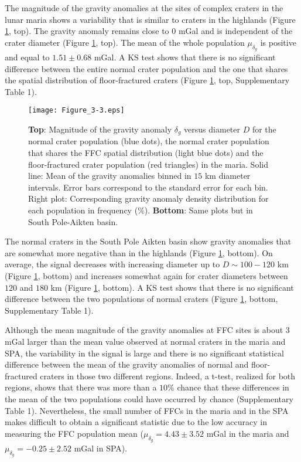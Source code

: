 The magnitude of the gravity anomalies at the sites of complex craters
in the lunar  maria shows a variability that is  similar to craters in
the  highlands (Figure  \ref{Figure3-3},  top).   The gravity  anomaly
remains close  to $0$ mGal and  is independent of the  crater diameter
(Figure  \ref{Figure3-3},  top).  The  mean  of  the whole  population
$\mu_{\delta_g}$ is positive and equal to  $1.51 \pm 0.68$ mGal.  A KS
test shows that there is  no significant difference between the entire
normal  crater  population  and  the   one  that  shares  the  spatial
distribution of floor-fractured  craters (Figure \ref{Figure3-3}, top,
Supplementary Table 1).
\begin{figure}[pb]
    \graphicspath{ {/Users/thorey/Documents/These/Projet/FFC/Gravi_GRAIL/Article/Papier/Proof/} }
  \begin{center}

    \texttt{[image: Figure\_3-3.eps]}
    \caption{\textbf{Top}: Magnitude of the gravity anomaly $\delta_g$
      versus  diameter  $D$ for  the  normal  crater population  (blue
      dots), the normal crater population  that shares the FFC spatial
      distribution (light  blue dots)  and the  floor-fractured crater
      population (red triangles) in the maria. Solid line: Mean of the
      gravity anomalies  binned in $15$ km  diameter intervals.  Error
      bars correspond to the standard error for each bin.  Right plot:
      Corresponding  gravity  anomaly  density distribution  for  each
      population in frequency ($\%$).  \textbf{Bottom}: Same plots but
      in South Pole-Aikten basin.}
    \label{Figure3-3}
  \end{center}
\end{figure}

The  normal  craters in  the  South  Pole  Aikten basin  show  gravity
anomalies  that  are somewhat  more  negative  than in  the  highlands
(Figure \ref{Figure3-3},  bottom).  On  average, the  signal decreases
with  increasing   diameter  up  to   $D  \sim  100-120$   km  (Figure
\ref{Figure3-3},  bottom)  and  increases somewhat  again  for  crater
diameters between $120$ and $180$ km (Figure \ref{Figure3-3}, bottom).
A KS  test shows that there  is no significant difference  between the
two  populations of  normal craters  (Figure \ref{Figure3-3},  bottom,
Supplementary Table 1).

Although the mean  magnitude of the gravity anomalies at  FFC sites is
about $3$ mGal  larger than the mean value observed  at normal craters
in the maria and SPA, the variability in the signal is large and there
is  no significant  statistical  difference between  the  mean of  the
gravity anomalies of  normal and floor-fractured craters  in those two
different regions.  Indeed, a t-test, realized for both regions, shows
that there was more than a $10\%$ chance that these differences in the
mean  of   the  two   populations  could   have  occurred   by  chance
(Supplementary Table  1).  Nevertheless, the  small number of  FFCs in
the  maria and  in the  SPA makes  difficult to  obtain a  significant
statistic due to the low accuracy in measuring the FFC population mean
($\mu_{\delta_g}   =4.43  \pm   3.52   $  mGal   in   the  maria   and
$\mu_{\delta_g} =-0.25\pm 2.52 $ mGal in SPA).

